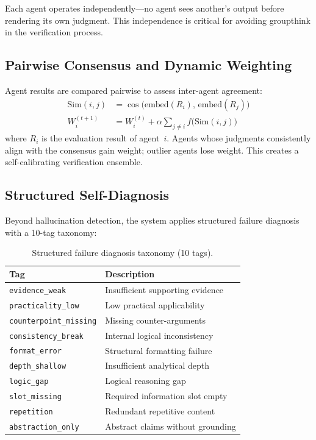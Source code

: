 \documentclass[11pt,a4paper]{article}
\begin{document}
Each agent operates independently---no agent sees another's output before rendering its own judgment. This independence is critical for avoiding groupthink in the verification process.

\subsection{Pairwise Consensus and Dynamic Weighting}

Agent results are compared pairwise to assess inter-agent agreement:
\begin{align}
  \text{Sim}(i,j) &= \cos\!\bigl(\text{embed}(R_i),\, \text{embed}(R_j)\bigr) \\
  W_i^{(t+1)} &= W_i^{(t)} + \alpha \sum_{j \neq i} f\!\bigl(\text{Sim}(i,j)\bigr)
\end{align}
where $R_i$ is the evaluation result of agent~$i$. Agents whose judgments consistently align with the consensus gain weight; outlier agents lose weight. This creates a self-calibrating verification ensemble.

\subsection{Structured Self-Diagnosis}

Beyond hallucination detection, the system applies structured failure diagnosis with a 10-tag taxonomy:

\begin{table}[h]
\centering
\caption{Structured failure diagnosis taxonomy (10 tags).}
\label{tab:failtags}
\small
\begin{tabular}{@{}ll@{}}
\toprule
\textbf{Tag} & \textbf{Description} \\
\midrule
\texttt{evidence\_weak} & Insufficient supporting evidence \\
\texttt{practicality\_low} & Low practical applicability \\
\texttt{counterpoint\_missing} & Missing counter-arguments \\
\texttt{consistency\_break} & Internal logical inconsistency \\
\texttt{format\_error} & Structural formatting failure \\
\texttt{depth\_shallow} & Insufficient analytical depth \\
\texttt{logic\_gap} & Logical reasoning gap \\
\texttt{slot\_missing} & Required information slot empty \\
\texttt{repetition} & Redundant repetitive content \\
\texttt{abstraction\_only} & Abstract claims without grounding \\
\bottomrule
\end{tabular}
\end{table}
\end{document}
